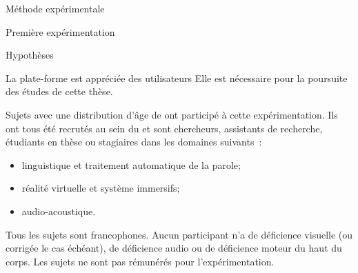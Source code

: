 \documentclass[myfrancais,ngerman,english,frenchb]{mythesis}
\begin{document}
\begin{mychapter}{Méthode expérimentale}
\begin{mysection}{Première expérimentation}
\begin{mysubsection}{Hypothèses}
\begin{myparagraph}{ La plate-forme est appréciée des utilisateurs}
					Elle est nécessaire pour la poursuite des études de cette thèse.
				\end{myparagraph}
			\end{mysubsection}
			\begin{mysubsection}{Sujets}
				 avec une distribution d'âge de  ont participé à cette expérimentation.
				Ils ont tous été recrutés au sein du  et sont chercheurs, assistants de recherche, étudiants en thèse ou stagiaires dans les domaines suivants~:
				\begin{itemize}
					\item linguistique et traitement automatique de la parole;
					\item réalité virtuelle et système immersifs;
					\item audio-acoustique.
				\end{itemize}

				Tous les sujets sont francophones.
				Aucun participant n'a de déficience visuelle (ou corrigée le cas échéant), de déficience audio ou de déficience moteur du haut du corps.
				Les sujets ne sont pas rémunérés pour l'expérimentation.


\end{mysubsection}
\end{mysection}
\end{mychapter}
\end{document}
